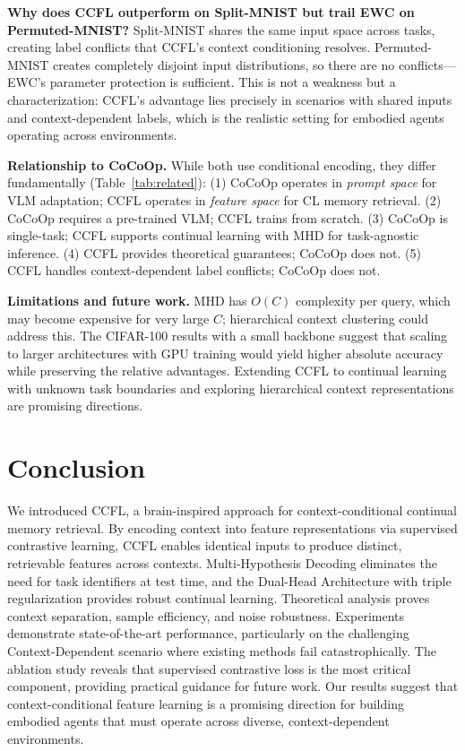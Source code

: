 \documentclass[letterpaper, 10pt, times]{article}
\begin{document}
\textbf{Why does CCFL outperform on Split-MNIST but trail EWC on Permuted-MNIST?} Split-MNIST shares the same input space across tasks, creating label conflicts that CCFL's context conditioning resolves. Permuted-MNIST creates completely disjoint input distributions, so there are no conflicts---EWC's parameter protection is sufficient. This is not a weakness but a characterization: CCFL's advantage lies precisely in scenarios with shared inputs and context-dependent labels, which is the realistic setting for embodied agents operating across environments.

\textbf{Relationship to CoCoOp.} While both use conditional encoding, they differ fundamentally (Table~\ref{tab:related}): (1) CoCoOp operates in \emph{prompt space} for VLM adaptation; CCFL operates in \emph{feature space} for CL memory retrieval. (2) CoCoOp requires a pre-trained VLM; CCFL trains from scratch. (3) CoCoOp is single-task; CCFL supports continual learning with MHD for task-agnostic inference. (4) CCFL provides theoretical guarantees; CoCoOp does not. (5) CCFL handles context-dependent label conflicts; CoCoOp does not.

\textbf{Limitations and future work.} MHD has $O(C)$ complexity per query, which may become expensive for very large $C$; hierarchical context clustering could address this. The CIFAR-100 results with a small backbone suggest that scaling to larger architectures with GPU training would yield higher absolute accuracy while preserving the relative advantages. Extending CCFL to continual learning with unknown task boundaries and exploring hierarchical context representations are promising directions.

\section{Conclusion}

We introduced CCFL, a brain-inspired approach for context-conditional continual memory retrieval. By encoding context into feature representations via supervised contrastive learning, CCFL enables identical inputs to produce distinct, retrievable features across contexts. Multi-Hypothesis Decoding eliminates the need for task identifiers at test time, and the Dual-Head Architecture with triple regularization provides robust continual learning. Theoretical analysis proves context separation, sample efficiency, and noise robustness. Experiments demonstrate state-of-the-art performance, particularly on the challenging Context-Dependent scenario where existing methods fail catastrophically. The ablation study reveals that supervised contrastive loss is the most critical component, providing practical guidance for future work. Our results suggest that context-conditional feature learning is a promising direction for building embodied agents that must operate across diverse, context-dependent environments.
\end{document}
